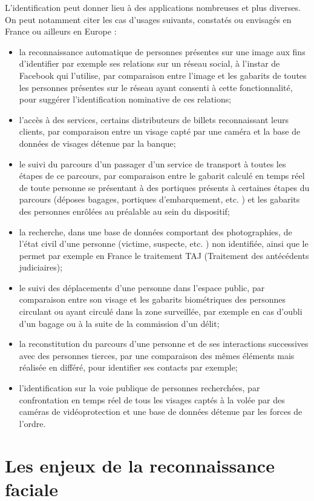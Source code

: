 \documentclass[12pt,french]{article}
\theoremstyle{plain}
\theoremstyle{definition}
\begin{document}
L’identification peut donner lieu à des applications nombreuses et plus diverses.
On peut notamment citer les cas d’usages suivants, constatés ou envisagés en France ou ailleurs en Europe :
\begin{itemize}
\item la reconnaissance automatique de personnes présentes sur une image aux fins d’identifier par exemple ses relations sur un réseau social,
  à l’instar de Facebook qui l’utilise, par comparaison entre l’image et les gabarits de toutes les personnes présentes sur le réseau ayant consenti à cette fonctionnalité, pour suggérer l’identification nominative de ces relations;
\item l’accès à des services, certains distributeurs de billets reconnaissant leurs clients, par comparaison entre un visage capté par une caméra et la base de données de visages détenue par la banque;
\item le suivi du parcours d’un passager d’un service de transport à toutes les étapes de ce parcours,
  par comparaison entre le gabarit calculé en temps réel de toute personne se présentant à des portiques présents à certaines étapes du parcours (déposes bagages, portiques d’embarquement, etc. )
  et les gabarits des personnes enrôlées au préalable au sein du dispositif;
\item la recherche, dans une base de données comportant des photographies, de l’état civil d’une personne (victime, suspecte, etc. ) non identifiée, ainsi que le permet par exemple en France le traitement TAJ (Traitement des antécédents judiciaires);
\item le suivi des déplacements d’une personne dans l’espace public, par comparaison entre son visage et les gabarits biométriques des personnes circulant ou ayant circulé dans la zone surveillée,
  par exemple en cas d’oubli d’un bagage ou à la suite de la commission d’un délit;
\item la reconstitution du parcours d’une personne et de ses interactions successives avec des personnes tierces, par une comparaison des mêmes éléments mais réalisée en différé, pour identifier ses contacts par exemple;
\item l’identification sur la voie publique de personnes recherchées, par confrontation en temps réel de tous les visages captés à la volée par des caméras  de vidéoprotection et une base de données détenue par les forces de l’ordre.
\end{itemize}


\part{Les enjeux de la reconnaissance faciale}
\end{document}
